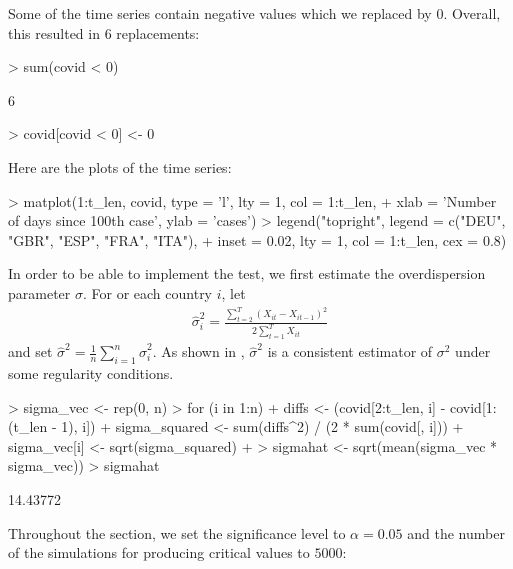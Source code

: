 \documentclass[a4paper]{article}
\begin{document}
Some of the time series contain negative values which we replaced by $0$. Overall, this resulted in $6$ replacements:

\begin{Schunk}
\begin{Sinput}
> sum(covid < 0)
\end{Sinput}
\begin{Soutput}
[1] 6
\end{Soutput}
\begin{Sinput}
> covid[covid < 0] <- 0
\end{Sinput}
\end{Schunk}

Here are the plots of the time series:

\begin{Schunk}
\begin{Sinput}
> matplot(1:t_len, covid, type = 'l', lty = 1, col = 1:t_len,
+         xlab = 'Number of days since 100th case', ylab = 'cases')
> legend("topright", legend = c("DEU", "GBR", "ESP", "FRA", "ITA"),
+        inset = 0.02, lty = 1, col = 1:t_len, cex = 0.8)
\end{Sinput}
\end{Schunk}

In order to be able to implement the test, we first estimate the overdispersion parameter $\sigma$. For or each country $i$, let
\begin{align*}
\hat{\sigma}_i^2 = \frac{\sum_{t=2}^T (X_{it}-X_{it-1})^2}{2 \sum_{t=1}^T X_{it}}
\end{align*}
and set $\hat{\sigma}^2 = \frac{1}{n} \sum_{i=1}^n \hat{\sigma}_i^2$. As shown in \cite{KhismatullinaVogt2023}, $\hat{\sigma}^2$ is a consistent estimator of $\sigma^2$ under some regularity conditions.


\begin{Schunk}
\begin{Sinput}
> sigma_vec <- rep(0, n)
> for (i in 1:n){
+   diffs <- (covid[2:t_len, i] - covid[1:(t_len - 1), i])
+   sigma_squared <- sum(diffs^2) / (2 * sum(covid[, i]))
+   sigma_vec[i] <- sqrt(sigma_squared)
+ }
> sigmahat <- sqrt(mean(sigma_vec * sigma_vec))
> sigmahat
\end{Sinput}
\begin{Soutput}
[1] 14.43772
\end{Soutput}
\end{Schunk}

Throughout the section, we set the significance level to $\alpha=0.05$ and the number of the simulations for producing critical values to $5000$:
\end{document}
